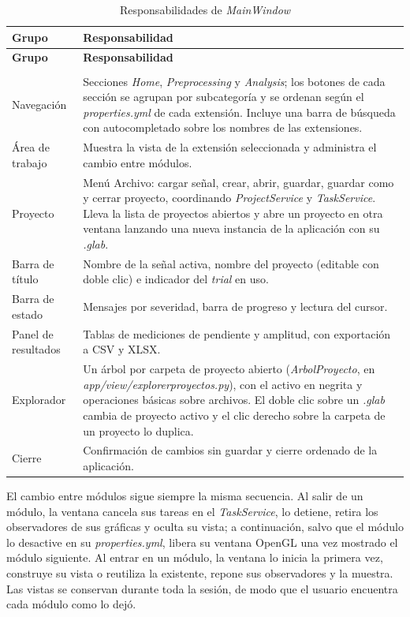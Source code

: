 \documentclass[12pt,letterpaper,oneside]{article}
\DeclareRobustCommand{\_}{\textunderscore\allowbreak}
\begin{document}
\begin{center}
\small
\begin{longtable}{|p{}|p{}|}
\hline
\textbf{Grupo} & \textbf{Responsabilidad} \\
\hline
\endfirsthead
\hline
\textbf{Grupo} & \textbf{Responsabilidad} \\
\hline
\endhead
\hline
\endfoot
\hline
\caption{Responsabilidades de \textit{MainWindow}} \label{tab:sdd_mainwindow} \\
\endlastfoot
Navegación & Secciones \textit{Home}, \textit{Preprocessing} y \textit{Analysis}; los botones de cada sección se agrupan por subcategoría y se ordenan según el \textit{properties.yml} de cada extensión. Incluye una barra de búsqueda con autocompletado sobre los nombres de las extensiones. \\
\hline
Área de trabajo & Muestra la vista de la extensión seleccionada y administra el cambio entre módulos. \\
\hline
Proyecto & Menú Archivo: cargar señal, crear, abrir, guardar, guardar como y cerrar proyecto, coordinando \textit{ProjectService} y \textit{TaskService}. Lleva la lista de proyectos abiertos y abre un proyecto en otra ventana lanzando una nueva instancia de la aplicación con su \textit{.glab}. \\
\hline
Barra de título & Nombre de la señal activa, nombre del proyecto (editable con doble clic) e indicador del \textit{trial} en uso. \\
\hline
Barra de estado & Mensajes por severidad, barra de progreso y lectura del cursor. \\
\hline
Panel de resultados & Tablas de mediciones de pendiente y amplitud, con exportación a CSV y XLSX. \\
\hline
Explorador & Un árbol por carpeta de proyecto abierto (\textit{ArbolProyecto}, en \textit{app/view/explorer\_proyectos.py}), con el activo en negrita y operaciones básicas sobre archivos. El doble clic sobre un \textit{.glab} cambia de proyecto activo y el clic derecho sobre la carpeta de un proyecto lo duplica. \\
\hline
Cierre & Confirmación de cambios sin guardar y cierre ordenado de la aplicación. \\
\hline
\end{longtable}
\end{center}

El cambio entre módulos sigue siempre la misma secuencia. Al salir de un módulo, la ventana cancela sus tareas en el \textit{TaskService}, lo detiene, retira los observadores de sus gráficas y oculta su vista; a continuación, salvo que el módulo lo desactive en su \textit{properties.yml}, libera su ventana OpenGL una vez mostrado el módulo siguiente. Al entrar en un módulo, la ventana lo inicia la primera vez, construye su vista o reutiliza la existente, repone sus observadores y la muestra. Las vistas se conservan durante toda la sesión, de modo que el usuario encuentra cada módulo como lo dejó.
\end{document}
